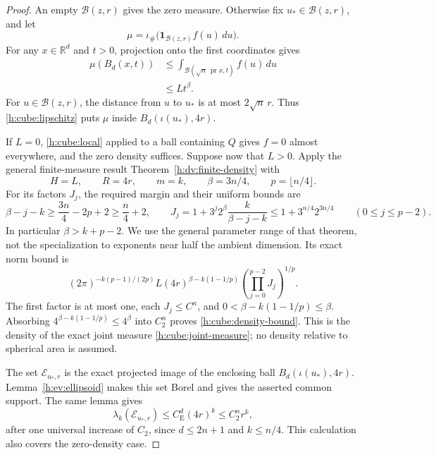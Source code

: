 \begin{proof}
An empty \(\mathcal B(z,r)\) gives the zero measure.  Otherwise fix
\(u_*\in\mathcal B(z,r)\), and let
\[
 \mu=\iota_\#\bigl(\mathbf1_{\mathcal B(z,r)}f(u)\,du\bigr).
\]
For any \(x\in\mathbb R^d\) and \(t>0\), projection onto the first
coordinates gives
\begin{equation}\label{h:cube:ambient-growth}
 \begin{split}
 \mu(B_d(x,t))
 &\le\int_{\mathcal B(\sqrt n\,\operatorname{pr}x,t)}f(u)\,du\\
 &\le Lt^\beta.
 \end{split}
\end{equation}
For \(u\in\mathcal B(z,r)\), the distance from \(u\) to \(u_*\) is
at most \(2\sqrt n\,r\).  Thus \eqref{h:cube:lipschitz} puts
\(\mu\) inside \(B_d(\iota(u_*),4r)\).

If \(L=0\), \eqref{h:cube:local} applied to a ball containing \(Q\)
gives \(f=0\) almost everywhere, and the zero density suffices.  Suppose
now that \(L>0\).  Apply the general finite-measure result
Theorem~\ref{h:dv:finite-density} with
\[
 H=L,\qquad R=4r,\qquad m=k,
 \qquad \beta=3n/4,\qquad p=\lfloor n/4\rfloor.
\]
For its factors \(J_j\), the required margin and their uniform bounds
are
\begin{equation}\label{h:cube:margin}
 \beta-j-k\ge\frac{3n}{4}-2p+2\ge\frac n4+2,
 \qquad
 J_j=1+3^j2^\beta\frac{k}{\beta-j-k}
 \le1+3^{n/4}2^{3n/4}
 \qquad(0\le j\le p-2).
\end{equation}
In particular \(\beta>k+p-2\).  We use the general parameter range
of that theorem, not the specialization to exponents near half
the ambient dimension.
Its exact norm bound is
\[
 (2\pi)^{-k(p-1)/(2p)}
 L(4r)^{\beta-k(1-1/p)}
 \left(\prod_{j=0}^{p-2}J_j\right)^{1/p}.
\]
The first factor is at most one, each \(J_j\le C^n\), and
\(0<\beta-k(1-1/p)\le\beta\).  Absorbing
\(4^{\beta-k(1-1/p)}\le4^\beta\) into \(C_2^n\) proves
\eqref{h:cube:density-bound}.  This is the density of the exact joint
measure \eqref{h:cube:joint-measure}; no density relative to spherical
area is assumed.

The set \(\mathcal E_{u_*,r}\) is the exact projected image of the
enclosing ball \(B_d(\iota(u_*),4r)\).  Lemma~\ref{h:ev:ellipsoid}
makes this set Borel and gives the asserted common support.  The same
lemma gives
\[
 \lambda_k(\mathcal E_{u_*,r})
 \le C_{\mathrm E}^d(4r)^k\le C_2^n r^k,
\]
after one universal increase of \(C_2\), since
\(d\le2n+1\) and \(k\le n/4\).  This calculation also covers the
zero-density case.
\end{proof}

